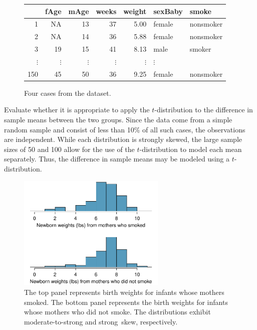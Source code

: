 \begin{figure}[h]
\centering
\begin{tabular}{rrrrrll}
  \hline
 & fAge & mAge & weeks & weight & sexBaby & smoke \\ 
  \hline
1 & NA & 13 &  37 & 5.00 & female & nonsmoker \\ 
  2 & NA & 14 &  36 & 5.88 & female & nonsmoker \\ 
  3 & 19 & 15 &  41 & 8.13 & male & smoker \\ 
  $\vdots$ &   $\vdots$ &   $\vdots$ &   $\vdots$ &   $\vdots$ &   $\vdots$ \\
  150 & 45 & 50 &  36 & 9.25 & female & nonsmoker \\ 
   \hline
\end{tabular}
\caption{Four cases from the  dataset.}
\label{babySmokeDF}
\end{figure}

\textD{\newpage}

\begin{examplewrap}
\begin{nexample} {Evaluate whether it is appropriate to apply the $t$-distribution to the difference in sample means between the two groups.}
Since the data come from a simple random sample and consist of less than 10\% of all such cases, the observations are independent. While each distribution is strongly skewed, the large sample sizes of 50 and 100 allow for the use of the $t$-distribution to model each mean separately. Thus, the difference in sample means may be modeled using a $t$-distribution.	
\end{nexample}
\end{examplewrap}

\begin{figure}[hhh]
\centering
\includegraphics[width=0.63\textwidth]{ch_inference_for_means_oi_biostat/figures/babySmokePlotOfTwoGroupsToExamineSkew/babySmokePlotOfTwoGroupsToExamineSkew}
\caption{The top panel represents birth weights for infants whose mothers smoked. The bottom panel represents the birth weights for infants whose mothers who did not smoke. The distributions exhibit moderate-to-strong and strong~skew, respectively.}
\label{babySmokePlotOfTwoGroupsToExamineSkew}
\end{figure}

